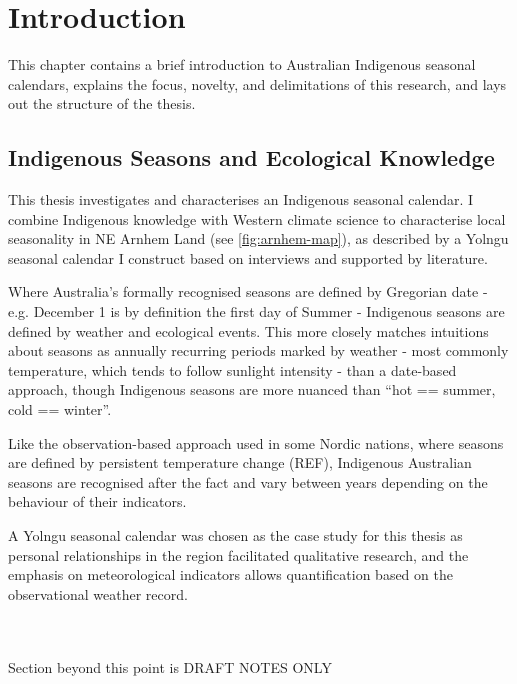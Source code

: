 \chapter{Introduction}
This chapter contains a brief introduction to Australian Indigenous seasonal calendars,
explains the focus, novelty, and delimitations of this research,
and lays out the structure of the thesis.


\section{Indigenous Seasons and Ecological Knowledge}


This thesis investigates and characterises an Indigenous seasonal calendar.
I combine Indigenous knowledge with Western climate science to characterise
local seasonality in NE Arnhem Land (see \autoref{fig:arnhem-map}),
as described by a Yolngu seasonal calendar I construct based on
interviews and supported by literature.


Where Australia's formally recognised seasons are defined by Gregorian date -
e.g. December 1 is by definition the first day of Summer - Indigenous seasons
are defined by weather and ecological events.
%
This more closely matches intuitions about seasons as annually recurring
periods marked by weather - most commonly temperature, which tends to
follow sunlight intensity - than a date-based approach, though Indigenous
seasons are more nuanced than ``hot == summer, cold == winter''.

Like the observation-based approach used in some Nordic nations, where
seasons are defined by persistent temperature change (REF),
Indigenous Australian seasons are recognised after the fact and vary
between years depending on the behaviour of their indicators.


A Yolngu seasonal calendar was chosen as the case study for this thesis
as personal relationships in the region facilitated qualitative research,
and the emphasis on meteorological indicators allows quantification based
on the observational weather record.
    


~\\
~\\
Section beyond this point is DRAFT NOTES ONLY



